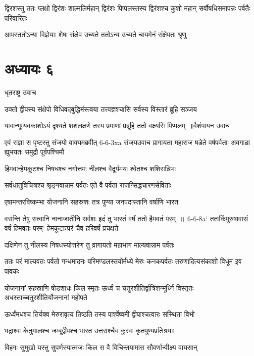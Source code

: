 \threelineshloka
{द्विरशस्तु ततः प्लक्षो द्विरंशः शाल्मलिर्महान्}
{द्विरंशः पिप्पलस्तस्य द्विरंशश्च कुशो महान्}
{सर्वौषधिसमापन्नः पर्वतैः परिवारितः}


\twolineshloka
{आपस्ततोऽन्या विज्ञेयाः शेषः संक्षेप उच्यते}
{ततोऽन्य उच्यते चायमेनं संक्षेपतः श्रृणु}


\chapter{अध्यायः ६}
\twolineshloka
{धृतराष्ट्र उवाच}
{}


\twolineshloka
{उक्तो द्वीपस्य संक्षेपो विधिवद्बुद्धिमंस्त्वया}
{तत्त्वज्ञश्चासि सर्वस्य विस्तारं ब्रूहि सञ्जय}


\threelineshloka
{यावान्भूम्यवकाशोऽयं दृश्यते शशलक्षणे}
{तस्य प्रमाणां प्रब्रूहि ततो वक्ष्यसि पिप्पलम् ॥वैशंपायन उवाच}
{}


\fourlineindentedshloka
{एवं राज्ञा स पृष्टस्तु संजयो वाक्यमब्रवीत्}
{6-6-3xa संजयउवाच}
{प्रागायता महाराज षडेते वर्षपर्वताः}
{अवगाढा ह्युभयतः समुद्रौ पूर्वपश्चिमौ}


\twolineshloka
{हिमवान्हेमकूटश्च निषधश्च नगोत्तमः}
{नीलश्च वैदूर्यमयः श्वेतश्च शशिसन्निभः}


\twolineshloka
{सर्वधातुविचित्रश्च श्रृङ्गवान्नाम पर्वतः}
{एते वै पर्वता राजन्सिद्धचारणसेविताः}


\twolineshloka
{एषामन्तरविष्कम्भा योजनानि सहस्रशः}
{तत्र पुण्या जनपदास्तानि वर्षाणि भारत}


\threelineshloka
{वसन्ति तेषु सत्वानि नानाजातीनि सर्वशः}
{इदं तु भारतं वर्षं ततो हैमवतं परम् ॥ 6-6-8a` ततःकिंपुरुषावासं वर्षं हिमवतः परम्'}
{हेमकूटात्परं चैव हरिवर्षं प्रचक्षते}


\twolineshloka
{दक्षिणेन तु नीलस्य निषधस्योत्तरेण तु}
{व्रागायतो महाभाग माल्यवान्नाम पर्वतः}


\threelineshloka
{ततः परं माल्यवतः पर्वतो गन्धमादनः}
{परिमण्डलस्तयोर्मध्ये मेरुः कनकपर्वतः}
{तरुणादित्यसंकाशो विधूम इव पावकः}


\threelineshloka
{योजनानां सहस्राणि षोडशाधः किल स्मृतः}
{ऊर्ध्वं च चतुरशीतिर्द्वात्रिंशन्मूर्ध्नि विस्तृतः}
{अधस्ताच्चतुरशीतिर्योजनानां महीपते}


\twolineshloka
{ऊर्ध्वंमधश्च तिर्यक्व मेरुरावृत्य तिष्ठति}
{तस्य पार्श्वेष्वमी द्वीपाश्चत्वारः सस्थिता विभो}


\twolineshloka
{भद्राश्वः केतुमालश्च जम्बूद्वीपश्च भारत}
{उत्तराश्चैव कुरवः कृतपुण्यप्रतिश्रयाः}


\twolineshloka
{विहगः सुमुखो यस्तु सुपर्णस्यात्मजः किल}
{स वै विचिन्तयामास सौवर्णान्वीक्ष्य वायसान्}


